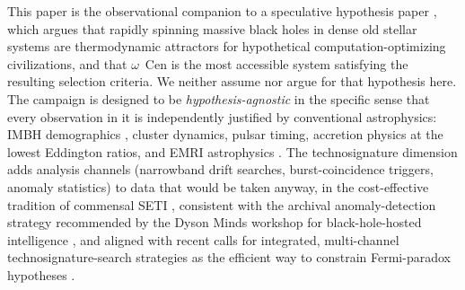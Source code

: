 \documentclass[11pt]{article}
\newcommand{\ocen}{\ensuremath{\omega}~Cen}
\begin{document}
This paper is the observational companion to a speculative hypothesis paper \citep[hereafter Paper A]{Swanson2026MTH}, which argues that rapidly spinning massive black holes in dense old stellar systems are thermodynamic attractors for hypothetical computation-optimizing civilizations, and that \ocen{} is the most accessible system satisfying the resulting selection criteria. We neither assume nor argue for that hypothesis here. The campaign is designed to be \emph{hypothesis-agnostic} in the specific sense that every observation in it is independently justified by conventional astrophysics: IMBH demographics \citep{Greene2020}, cluster dynamics, pulsar timing, accretion physics at the lowest Eddington ratios, and EMRI astrophysics \citep{AmaroSeoane2018}. The technosignature dimension adds analysis channels (narrowband drift searches, burst-coincidence triggers, anomaly statistics) to data that would be taken anyway, in the cost-effective tradition of commensal SETI \citep{Tarter2001,Wright2022,Lacki2025}, consistent with the archival anomaly-detection strategy recommended by the Dyson Minds workshop for black-hole-hosted intelligence \citep{Curtis2026DysonMinds}, and aligned with recent calls for integrated, multi-channel technosignature-search strategies as the efficient way to constrain Fermi-paradox hypotheses \citep{Crawford2026}.
\end{document}
